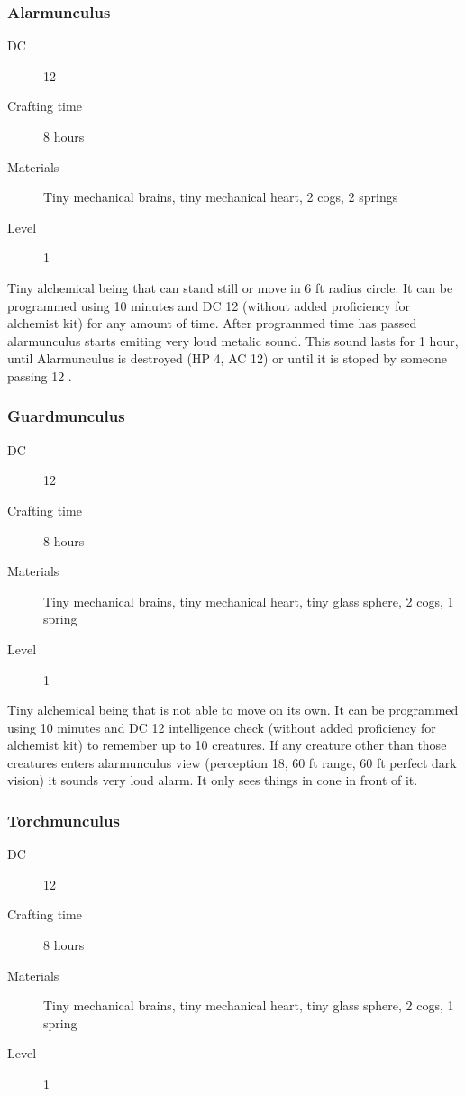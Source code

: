 \subsubsection{Alarmunculus}

\begin{description}
\item [DC] 12 \arcana
\item [Crafting time] 8 hours
\item [Materials] Tiny mechanical brains, tiny mechanical heart, 2 cogs, 2 springs
\item [Level] 1
\end{description}

Tiny alchemical being that can stand still or move in 6 ft radius circle. It can be programmed using 10 minutes and DC 12 \intelligence{} (without added proficiency for alchemist kit) for any amount of time. After programmed time has passed alarmunculus starts emiting very loud metalic sound. This sound lasts for 1 hour, until Alarmunculus is destroyed (HP 4, AC 12) or until it is stoped by someone passing 12 \intelligence.

\subsubsection{Guardmunculus}

\begin{description}
\item [DC] 12 \arcana
\item [Crafting time] 8 hours
\item [Materials] Tiny mechanical brains, tiny mechanical heart, tiny glass sphere, 2 cogs, 1 spring
\item [Level] 1
\end{description}

Tiny alchemical being that is not able to move on its own. It can be programmed using 10 minutes and DC 12 intelligence check (without added proficiency for alchemist kit) to remember up to 10 creatures. If any creature other than those creatures enters alarmunculus view (perception 18, 60 ft range, 60 ft perfect dark vision) it sounds very loud alarm. It only sees things in cone in front of it.

\subsubsection{Torchmunculus}

\begin{description}
\item [DC] 12 \arcana
\item [Crafting time] 8 hours
\item [Materials] Tiny mechanical brains, tiny mechanical heart, tiny glass sphere, 2 cogs, 1 spring
\item [Level] 1
\end{description}

